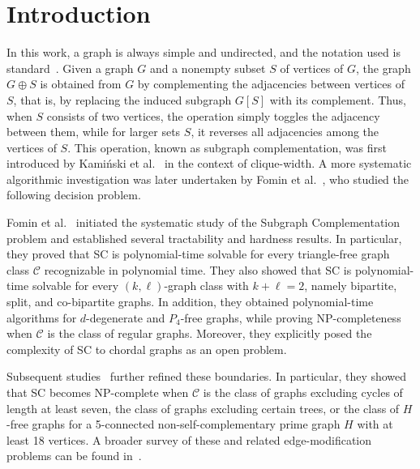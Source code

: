 \documentclass[11pt]{article}
\theoremstyle{definition}
\begin{document}
\section{Introduction}
In this work, a graph is always simple and undirected, and the notation used is standard~\cite{BondyM08,Diestel2017}.
Given a graph $G$ and a nonempty subset $S$ of vertices of $G$, the graph $G \oplus S$ is obtained from $G$ by complementing the adjacencies between vertices of $S$, that is, by replacing the induced subgraph $G[S]$ with its complement.
Thus, when $S$ consists of two vertices, the operation simply toggles the adjacency between them, while for larger sets $S$, it reverses all adjacencies among the vertices of $S$.
This operation, known as subgraph complementation, was first introduced by Kamiński et al.~\cite{DBLP:journals/dam/KaminskiLM09} in the context of clique-width.
A more systematic algorithmic investigation was later undertaken by Fomin et al.~\cite{DBLP:journals/algorithmica/FominGST20}, who studied the following decision problem.

\medskip
{}


Fomin et al.~\cite{DBLP:journals/algorithmica/FominGST20} initiated the systematic study of the Subgraph Complementation problem and established several tractability and hardness results. In particular, they proved that SC is polynomial-time solvable for every triangle-free graph class $\mathcal{C}$ recognizable in polynomial time. They also showed that SC is polynomial-time solvable for every $(k,\ell)$-graph class with $k+\ell=2$, namely bipartite, split, and co-bipartite graphs. In addition, they obtained polynomial-time algorithms for $d$-degenerate and $P_4$-free graphs, while proving NP-completeness when $\mathcal{C}$ is the class of regular graphs. Moreover, they explicitly posed the complexity of SC to chordal graphs as an open problem.

Subsequent studies~\cite{DBLP:journals/algorithmica/AntonyGPSSS22,antony2024cutting,DBLP:journals/ipl/AntonyPS25} further refined these boundaries. In particular, they showed that SC becomes NP-complete when $\mathcal{C}$ is the class of graphs excluding cycles of length at least seven, the class of graphs excluding certain trees, or the class of $H$-free graphs for a 5-connected non-self-complementary prime graph $H$ with at least 18 vertices. A broader survey of these and related edge-modification problems can be found in~\cite{DBLP:journals/csr/CrespelleDFG23}.
\end{document}
